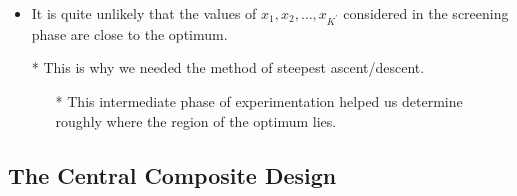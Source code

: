 \begin{itemize}
\begin{itemize}
            \item It is quite unlikely that the values of $ x_1,x_2,\ldots,x_{K^\prime} $ considered in the screening phase are close
                  to the optimum.
            \item[*] This is why we needed the method of steepest ascent/descent.
                \begin{itemize}
                    \item[*] This intermediate phase of experimentation helped us determine roughly where the region of
                        the optimum lies.
                \end{itemize}
        \end{itemize}
\end{itemize}
\subsection{The Central Composite Design}
